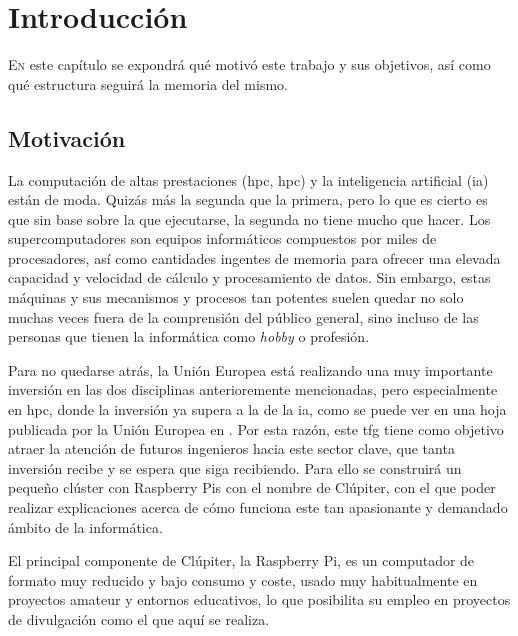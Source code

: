 \chapter{Introducción}
\label{chap:introducion}

\lettrine{E}{n} este capítulo se expondrá qué motivó este trabajo y sus objetivos, así como qué estructura seguirá la memoria del mismo.


\section{Motivación}
\label{sec:motivacion}

La computación de altas prestaciones (\acrshort{hpc}, \acrlong{hpc}) y la inteligencia artificial (\acrshort{ia}) están de moda. Quizás más la segunda que la primera, pero lo que es cierto es que sin base sobre la que ejecutarse, la segunda no tiene mucho que hacer.
Los supercomputadores son equipos informáticos compuestos por miles de procesadores, así como cantidades ingentes de memoria para ofrecer una elevada capacidad y velocidad de cálculo y procesamiento de datos.
Sin embargo, estas máquinas y sus mecanismos y procesos tan potentes suelen quedar no solo muchas veces fuera de la comprensión del público general, sino incluso de las personas que tienen la informática como \textit{hobby} o profesión.

Para no quedarse atrás, la Unión Europea está realizando una muy importante inversión en las dos disciplinas anterioremente mencionadas, pero especialmente en \acrshort{hpc}, donde la inversión ya supera a la de la \acrshort{ia}, como se puede ver en una hoja publicada por la Unión Europea en \cite{eu_factsheet_digital}.
Por esta razón, este \acrshort{tfg} tiene como objetivo atraer la atención de futuros ingenieros hacia este sector clave, que tanta inversión recibe y se espera que siga recibiendo. Para ello se construirá un pequeño clúster con Raspberry Pis con el nombre de Clúpiter, con el que poder realizar explicaciones acerca de cómo funciona este tan apasionante y demandado ámbito de la informática.

El principal componente de Clúpiter, la Raspberry Pi, es un computador de formato muy reducido y bajo consumo y coste, usado muy habitualmente en proyectos amateur y entornos educativos, lo que posibilita su empleo en proyectos de divulgación como el que aquí se realiza.

